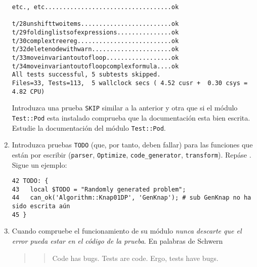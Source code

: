 \begin{enumerate}
\begin{verbatim}
etc., etc...................................ok

t/28unshifttwoitems.........................ok
t/29foldinglistsofexpressions...............ok
t/30complextreereg..........................ok
t/32deletenodewithwarn......................ok
t/33moveinvariantoutofloop..................ok
t/34moveinvariantoutofloopcomplexformula....ok
All tests successful, 5 subtests skipped.
Files=33, Tests=113,  5 wallclock secs ( 4.52 cusr +  0.30 csys =  4.82 CPU)
\end{verbatim}
Introduzca una prueba \verb|SKIP| similar a la anterior y otra que 
si el módulo
\verb|Test::Pod| esta instalado comprueba
que la documentación esta bien escrita.
Estudie la documentación del módulo \verb|Test::Pod|.

\item
Introduzca pruebas 
\verb|TODO| (que, por tanto, deben fallar) para las funciones que están por escribir
(\verb|parser|, \verb|Optimize|, \verb|code_generator|, \verb|transform|).
Repáse . Sigue un ejemplo:

\begin{verbatim}
42 TODO: {
43   local $TODO = "Randomly generated problem";
44   can_ok('Algorithm::Knap01DP', 'GenKnap'); # sub GenKnap no ha sido escrita aún
45 }
\end{verbatim}

\item
Cuando compruebe el funcionamiento de su módulo 
\emph{nunca descarte que el error pueda estar en
el código de la prueba}. En palabras de Schwern

\begin{verse}
\begin{quote}
Code has bugs. Tests are code. Ergo, tests have bugs.\\

\end{quote}
\end{verse}


\end{enumerate}
